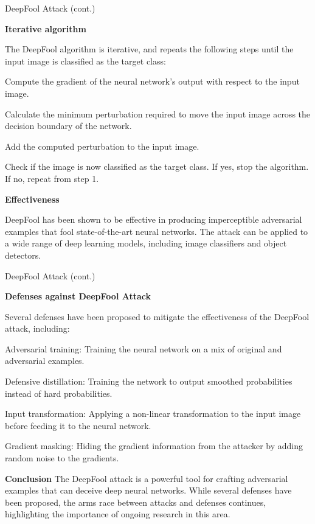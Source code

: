 \documentclass[aspectratio=169, 9pt]{beamer}
\theoremstyle{definition}
\begin{document}
\begin{frame}{DeepFool Attack (cont.)}

\textbf{Iterative algorithm}

The DeepFool algorithm is iterative, and repeats the following steps until the input image is classified as the target class:

Compute the gradient of the neural network's output with respect to the input image.

Calculate the minimum perturbation required to move the input image across the decision boundary of the network.

Add the computed perturbation to the input image.

Check if the image is now classified as the target class. If yes, stop the algorithm. If no, repeat from step 1.

\vspace{0.5cm}

\textbf{Effectiveness}

DeepFool has been shown to be effective in producing imperceptible adversarial examples that fool state-of-the-art neural networks. The attack can be applied to a wide range of deep learning models, including image classifiers and object detectors.

\end{frame}
\begin{frame}{DeepFool Attack (cont.)}

\textbf{Defenses against DeepFool Attack}

Several defenses have been proposed to mitigate the effectiveness of the DeepFool attack, including:

Adversarial training: Training the neural network on a mix of original and adversarial examples.

Defensive distillation: Training the network to output smoothed probabilities instead of hard probabilities.

Input transformation: Applying a non-linear transformation to the input image before feeding it to the neural network.

Gradient masking: Hiding the gradient information from the attacker by adding random noise to the gradients.

\vspace{0.5cm}
\textbf{Conclusion}
The DeepFool attack is a powerful tool for crafting adversarial examples that can deceive deep neural networks. While several defenses have been proposed, the arms race between attacks and defenses continues, highlighting the importance of ongoing research in this area.
\end{frame}
\end{document}
